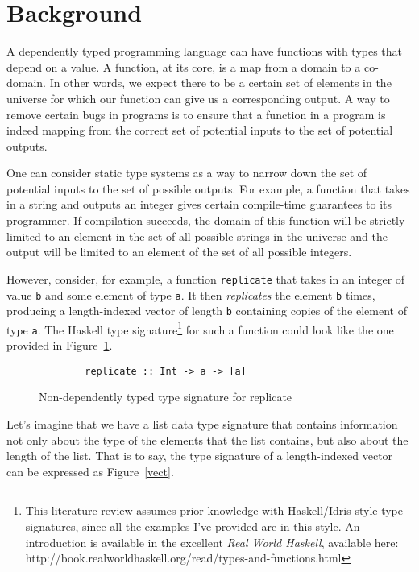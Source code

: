 \section{Background}
A dependently typed programming language can have functions with types that
depend on a value. A function, at its core, is a map from a domain to a
co-domain. In other words, we expect there to be a certain set of elements in
the universe for which our function can give us a corresponding output. A way to
remove certain bugs in programs is to ensure that a function in a program is
indeed mapping from the correct set of potential inputs to the set of potential
outputs. 

One can consider static type systems as a way to narrow down the set of
potential inputs to the set of possible outputs. For example, a function that
takes in a string and outputs an integer gives certain compile-time guarantees
to its programmer. If compilation succeeds, the domain of this function will be
strictly limited to an element in the set of all possible strings in the
universe and the output will be limited to an element of the set of all possible
integers. 

However, consider, for example, a function \texttt{replicate} that takes in an
integer of value \texttt{b} and some element of type \texttt{a}. It then
\textit{replicates} the element \texttt{b} times, producing a length-indexed
vector of length \texttt{b} containing copies of the element of type \texttt{a}.
The Haskell type signature\footnote{This literature review assumes prior
knowledge with Haskell/Idris-style type signatures, since all the examples I've
provided are in this style. An introduction is available in the excellent
\textit{Real World Haskell}, available here:
http://book.realworldhaskell.org/read/types-and-functions.html} for such a
function could look like the one provided in Figure~\ref{replicate_dec}.

\begin{figure}[ht!!!!!!!]
    \caption{Non-dependently typed type signature for replicate}
    \label{replicate_dec}
    \begin{lstlisting}
        replicate :: Int -> a -> [a]
    \end{lstlisting}
\end{figure} 


Let's imagine that we have a list data type signature that contains information
not only about the type of the elements that the list contains, but also about
the length of the list. That is to say, the type signature of a length-indexed
vector can be expressed as Figure~\ref{vect}.

